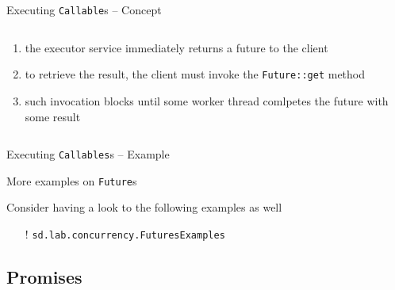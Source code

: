 \documentclass[presentation]{beamer}\mode<presentation>{\usetheme{AMSBolognaFC}}
\begin{document}
\begin{frame}[c,allowframebreaks]{Executing \texttt{Callable}s -- Concept}
\begin{columns}
\begin{column}{.4\linewidth}
\begin{enumerate}
				\item the executor service \alert{immediately} returns a future to the client

				\item to retrieve the result, the client must invoke the \alert{\texttt{Future::get}} method

				\item such invocation \alert{blocks} until some worker thread \alert{comlpetes} the future with some result
			\end{enumerate}
		\end{column}
	\end{columns}

\end{frame}

\begin{frame}[c]{Executing \texttt{Callables}s -- Example}

	

\end{frame}

\begin{frame}[c]{More examples on \texttt{Future}s}

	Consider having a look to the following examples as well
	\begin{itemize}
		\item[!] \texttt{sd.lab.concurrency.\alert{FuturesExamples}}
	\end{itemize}

\end{frame}

\subsection{Promises}
\end{document}
